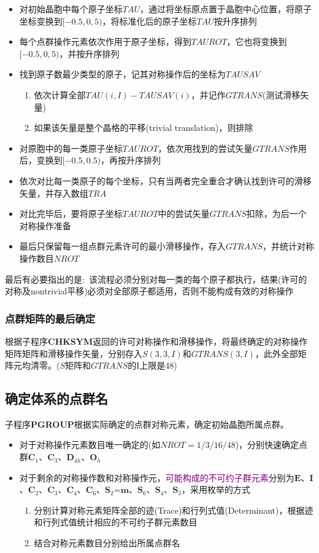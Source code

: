 \documentclass{article}      %
\begin{document}
\begin{itemize}
	\item 对初始晶胞中每个原子坐标$\mathit{TAU}$，通过将坐标原点置于晶胞中心位置，将原子坐标变换到$[-0.5,0,5)$，将标准化后的原子坐标$\mathit{TAU}$按升序排列
	\item 每个点群操作元素依次作用于原子坐标，得到$\mathit{TAUROT}$，它也将变换到$[-0.5,0,5)$，并按升序排列
	\item 找到原子数最少类型的原子，记其对称操作后的坐标为$\mathit{TAUSAV}$
		\begin{enumerate}
			\item 依次计算全部$\mathit{TAU}(i,I)-\mathit{TAUSAV(i)}$，并记作$\mathit{GTRANS}$(测试滑移矢量)
			\item 如果该矢量是整个晶格的平移(\textrm{trivial translation})，则排除
		\end{enumerate}
	\item 对原胞中的每一类原子坐标$TAUROT$，依次用找到的尝试矢量$\mathit{GTRANS}$作用后，变换到$[-0.5,0.5)$，再按升序排列
	\item 依次对比每一类原子的每个坐标，只有当两者完全重合才确认找到许可的滑移矢量，并存入数组$\mathit{TRA}$
	\item 对比完毕后，要将原子坐标$TAUROT$中的尝试矢量$\mathit{GTRANS}$扣除，为后一个对称操作准备
	\item 最后只保留每一组点群元素许可的最小滑移操作，存入$\mathit{GTRANS}$，并统计对称操作数目$\mathit{NROT}$
\end{itemize}
最后有必要指出的是:~该流程必须分别对每一类的每个原子都执行，结果(许可的对称及nontrivial平移)必须对全部原子都适用，否则不能构成有效的对称操作
\subsubsection{点群矩阵的最后确定}
根据子程序\textbf{CHKSYM}返回的许可对称操作和滑移操作，将最终确定的对称操作矩阵矩阵和滑移操作矢量，分别存入$\mathit{S}(3,3,I)$和$\mathit{GTRANS(3,I)}$，此外全部矩阵元均清零。($\mathit{S}$矩阵和$\mathit{GTRANS}$的I上限是48)
\subsection{确定体系的点群名}
子程序\textbf{PGROUP}根据实际确定的点群对称元素，确定初始晶胞所属点群。
\begin{itemize}
	\item 对于对称操作元素数目唯一确定的(如$\mathit{NROT}=1/3/16/48$)，分别快速确定点群$\mathbf{C}_1$、$\mathbf{C}_3$、$\mathbf{D}_{4h}$、$\mathbf{O}_h$
	\item 对于剩余的对称操作数和对称操作元，\textcolor{purple}{可能构成的不可约子群元素}分别为$\mathbf{E}$、$\mathbf{I}$、$\mathbf{C}_2$、$\mathbf{C}_3$、$\mathbf{C}_4$、$\mathbf{C}_6$、$\mathbf{S}_2$=$\mathbf{m}$、$\mathbf{S}_6$、$\mathbf{S}_4$、$\mathbf{S}_3$，采用枚举的方式
		\begin{enumerate}
			\item 分别计算对称元素矩阵全部的迹(\textrm{Trace})和行列式值(\textrm{Determinant})，根据迹和行列式值统计相应的不可约子群元素数目
			\item 结合对称元素数目分别给出所属点群名
		\end{enumerate}
\end{itemize}
\end{document}
